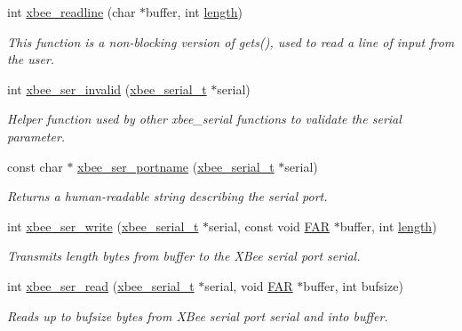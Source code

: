 \begin{DoxyCompactItemize}
\item 
int \hyperlink{group__hal__posix_ga8c0c80b64f63d395e718172190b21fcc}{xbee\-\_\-readline} (char $\ast$buffer, int \hyperlink{group__zdo_gab2b3adeb2a67e656ff030b56727fd0ac}{length})
\begin{DoxyCompactList}\small\item\em This function is a non-\/blocking version of gets(), used to read a line of input from the user. \end{DoxyCompactList}\item 
int \hyperlink{group__hal__posix_ga3c79f6b72b6cfc3cc5c4524450f661b9}{xbee\-\_\-ser\-\_\-invalid} (\hyperlink{structxbee__serial__t}{xbee\-\_\-serial\-\_\-t} $\ast$serial)
\begin{DoxyCompactList}\small\item\em Helper function used by other xbee\-\_\-serial functions to validate the {\itshape serial} parameter. \end{DoxyCompactList}\item 
const char $\ast$ \hyperlink{group__hal__posix_ga898057d1b7645785e7f3d6256828d039}{xbee\-\_\-ser\-\_\-portname} (\hyperlink{structxbee__serial__t}{xbee\-\_\-serial\-\_\-t} $\ast$serial)
\begin{DoxyCompactList}\small\item\em Returns a human-\/readable string describing the serial port. \end{DoxyCompactList}\item 
int \hyperlink{group__hal__posix_ga2ca4e60c9d642084afa52dff9e1f6be4}{xbee\-\_\-ser\-\_\-write} (\hyperlink{structxbee__serial__t}{xbee\-\_\-serial\-\_\-t} $\ast$serial, const void \hyperlink{group__hal_gaef060b3456fdcc093a7210a762d5f2ed}{F\-A\-R} $\ast$buffer, int \hyperlink{group__zdo_gab2b3adeb2a67e656ff030b56727fd0ac}{length})
\begin{DoxyCompactList}\small\item\em Transmits {\itshape length} bytes from {\itshape buffer} to the X\-Bee serial port {\itshape serial}. \end{DoxyCompactList}\item 
int \hyperlink{group__hal__posix_ga8263312373c03a79a718142e051b3342}{xbee\-\_\-ser\-\_\-read} (\hyperlink{structxbee__serial__t}{xbee\-\_\-serial\-\_\-t} $\ast$serial, void \hyperlink{group__hal_gaef060b3456fdcc093a7210a762d5f2ed}{F\-A\-R} $\ast$buffer, int bufsize)
\begin{DoxyCompactList}\small\item\em Reads up to {\itshape bufsize} bytes from X\-Bee serial port {\itshape serial} and into {\itshape buffer}. \end{DoxyCompactList}\item 

\end{DoxyCompactItemize}
